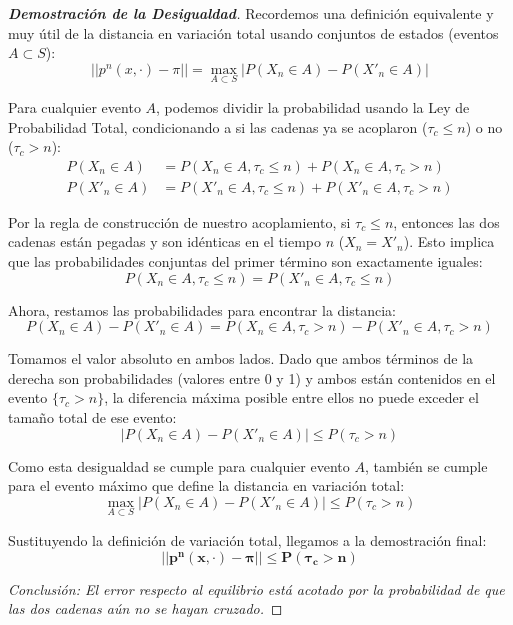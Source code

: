 \documentclass[10pt,a4paper]{article}
\begin{document}
\begin{proof}[\textbf{Demostración de la Desigualdad}]
    Recordemos una definición equivalente y muy útil de la distancia en variación total usando conjuntos de estados (eventos $A \subset S$):
    \[ ||p^n(x, \cdot) - \pi|| = \max_{A \subset S} |P(X_n \in A) - P(X'_n \in A)| \]
    
    Para cualquier evento $A$, podemos dividir la probabilidad usando la Ley de Probabilidad Total, condicionando a si las cadenas ya se acoplaron ($\tau_c \le n$) o no ($\tau_c > n$):
    \begin{align*}
        P(X_n \in A) &= P(X_n \in A, \tau_c \le n) + P(X_n \in A, \tau_c > n) \\
        P(X'_n \in A) &= P(X'_n \in A, \tau_c \le n) + P(X'_n \in A, \tau_c > n)
    \end{align*}
    
    Por la regla de construcción de nuestro acoplamiento, si $\tau_c \le n$, entonces las dos cadenas están pegadas y son idénticas en el tiempo $n$ ($X_n = X'_n$). Esto implica que las probabilidades conjuntas del primer término son exactamente iguales:
    \[ P(X_n \in A, \tau_c \le n) = P(X'_n \in A, \tau_c \le n) \]
    
    Ahora, restamos las probabilidades para encontrar la distancia:
    \[ P(X_n \in A) - P(X'_n \in A) = P(X_n \in A, \tau_c > n) - P(X'_n \in A, \tau_c > n) \]
    
    Tomamos el valor absoluto en ambos lados. Dado que ambos términos de la derecha son probabilidades (valores entre 0 y 1) y ambos están contenidos en el evento $\{\tau_c > n\}$, la diferencia máxima posible entre ellos no puede exceder el tamaño total de ese evento:
    \[ |P(X_n \in A) - P(X'_n \in A)| \le P(\tau_c > n) \]
    
    Como esta desigualdad se cumple para cualquier evento $A$, también se cumple para el evento máximo que define la distancia en variación total:
    \[ \max_{A \subset S} |P(X_n \in A) - P(X'_n \in A)| \le P(\tau_c > n) \]
    
    Sustituyendo la definición de variación total, llegamos a la demostración final:
    \[ \mathbf{||p^n(x, \cdot) - \pi|| \le P(\tau_c > n)} \]
    
    \textit{Conclusión: El error respecto al equilibrio está acotado por la probabilidad de que las dos cadenas aún no se hayan cruzado.}
\end{proof}

\newpage
\end{document}
